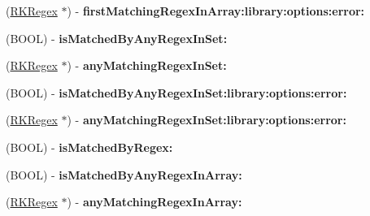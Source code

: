 \begin{DoxyCompactItemize}
\item 
\hypertarget{interface_n_s_object_07_regex_kit_additions_08_a0a3a752010fc4ace31b335238aa9a5ce}{(\hyperlink{interface_r_k_regex}{R\-K\-Regex} $\ast$) -\/ {\bfseries first\-Matching\-Regex\-In\-Array\-:library\-:options\-:error\-:}}\label{interface_n_s_object_07_regex_kit_additions_08_a0a3a752010fc4ace31b335238aa9a5ce}

\item 
\hypertarget{interface_n_s_object_07_regex_kit_additions_08_af66544d1bee273f94d7a8ad709cad29e}{(B\-O\-O\-L) -\/ {\bfseries is\-Matched\-By\-Any\-Regex\-In\-Set\-:}}\label{interface_n_s_object_07_regex_kit_additions_08_af66544d1bee273f94d7a8ad709cad29e}

\item 
\hypertarget{interface_n_s_object_07_regex_kit_additions_08_a69a9635423db7d68d48bbbf043055b40}{(\hyperlink{interface_r_k_regex}{R\-K\-Regex} $\ast$) -\/ {\bfseries any\-Matching\-Regex\-In\-Set\-:}}\label{interface_n_s_object_07_regex_kit_additions_08_a69a9635423db7d68d48bbbf043055b40}

\item 
\hypertarget{interface_n_s_object_07_regex_kit_additions_08_a28b2ac22315f9e5efb8941e3b49f4c45}{(B\-O\-O\-L) -\/ {\bfseries is\-Matched\-By\-Any\-Regex\-In\-Set\-:library\-:options\-:error\-:}}\label{interface_n_s_object_07_regex_kit_additions_08_a28b2ac22315f9e5efb8941e3b49f4c45}

\item 
\hypertarget{interface_n_s_object_07_regex_kit_additions_08_a51c9e76d907923cc352a4170f8eb2487}{(\hyperlink{interface_r_k_regex}{R\-K\-Regex} $\ast$) -\/ {\bfseries any\-Matching\-Regex\-In\-Set\-:library\-:options\-:error\-:}}\label{interface_n_s_object_07_regex_kit_additions_08_a51c9e76d907923cc352a4170f8eb2487}

\item 
\hypertarget{interface_n_s_object_07_regex_kit_additions_08_a5742930816e67880ce0d193cc74a1cc8}{(B\-O\-O\-L) -\/ {\bfseries is\-Matched\-By\-Regex\-:}}\label{interface_n_s_object_07_regex_kit_additions_08_a5742930816e67880ce0d193cc74a1cc8}

\item 
\hypertarget{interface_n_s_object_07_regex_kit_additions_08_ab4b78415a5d2da85b3f602f52ba98f65}{(B\-O\-O\-L) -\/ {\bfseries is\-Matched\-By\-Any\-Regex\-In\-Array\-:}}\label{interface_n_s_object_07_regex_kit_additions_08_ab4b78415a5d2da85b3f602f52ba98f65}

\item 
\hypertarget{interface_n_s_object_07_regex_kit_additions_08_ae9305db5f4061b437c982c3c557c3619}{(\hyperlink{interface_r_k_regex}{R\-K\-Regex} $\ast$) -\/ {\bfseries any\-Matching\-Regex\-In\-Array\-:}}\label{interface_n_s_object_07_regex_kit_additions_08_ae9305db5f4061b437c982c3c557c3619}


\end{DoxyCompactItemize}
